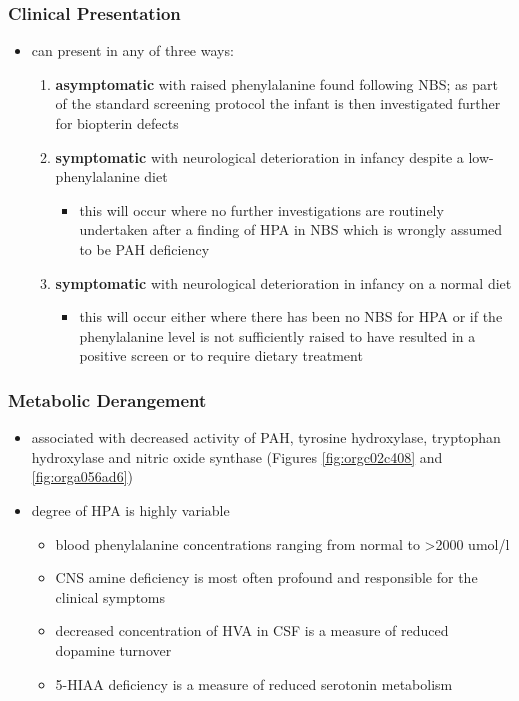 \documentclass{scrartcl}
\begin{document}
\subsubsection{Clinical Presentation}
\label{sec:org4dbbe80}
\begin{itemize}
\item can present in any of three ways:
\begin{enumerate}
\item \textbf{asymptomatic} with raised phenylalanine found following NBS; as part of
the standard screening protocol the infant is then investigated
further for biopterin defects
\item \textbf{symptomatic} with neurological deterioration in infancy despite a
low-phenylalanine diet
\begin{itemize}
\item this will occur where no further investigations are routinely
undertaken after a finding of HPA in NBS which is wrongly
assumed to be PAH deficiency
\end{itemize}
\item \textbf{symptomatic} with neurological deterioration in infancy on a
normal diet
\begin{itemize}
\item this will occur either where there has been no NBS for HPA or
if the phenylalanine level is not sufficiently raised to have
resulted in a positive screen or to require dietary treatment
\end{itemize}
\end{enumerate}
\end{itemize}
\subsubsection{Metabolic Derangement}
\label{sec:orgff75fe6}
\begin{itemize}
\item associated with decreased activity of PAH, tyrosine hydroxylase,
tryptophan hydroxylase and nitric oxide synthase (Figures \ref{fig:orgc02c408}
and \ref{fig:orga056ad6})
\item degree of HPA is highly variable
\begin{itemize}
\item blood phenylalanine concentrations ranging from normal to \textgreater{}2000
umol/l
\item CNS amine deficiency is most often profound and responsible for
the clinical symptoms
\item decreased concentration of HVA in CSF is a measure of reduced
dopamine turnover
\item 5-HIAA deficiency is a measure of reduced serotonin metabolism
\end{itemize}
\end{itemize}
\end{document}
